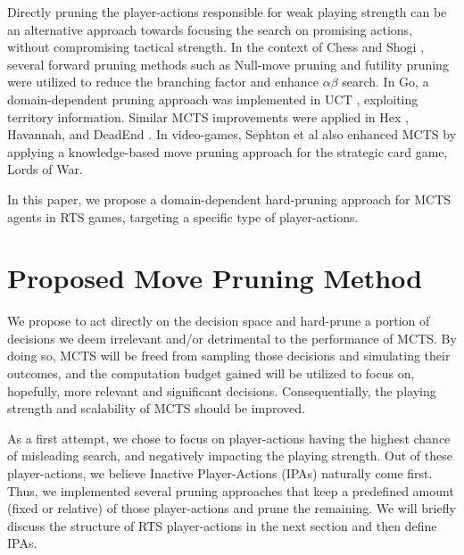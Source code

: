 \documentclass[conference]{IEEEtran}
\begin{document}
Directly pruning the player-actions responsible for weak playing strength can be an alternative approach towards focusing the search on promising actions, without compromising tactical strength. In the context of Chess \cite{heinz_adaptive_1999} and Shogi \cite{hoki_efficiency_2012}, several forward pruning methods such as Null-move pruning and futility pruning were utilized to reduce the branching factor and enhance $\alpha\beta$ search. In Go, a domain-dependent pruning approach was implemented in UCT \cite{huang_pruning_2010-1}, exploiting territory information. Similar MCTS improvements were applied in Hex \cite{arneson_monte_2010-1}, Havannah, \cite{dugueperoux_pruning_2016} and DeadEnd \cite{he_game_2008-1}. In video-games, Sephton et al \cite{sephton_heuristic_2014} also enhanced MCTS by applying a knowledge-based move pruning approach for the strategic card game, Lords of War.

In this paper, we propose a domain-dependent hard-pruning approach for MCTS agents in RTS games, targeting a specific type of player-actions.



\section{Proposed Move Pruning Method}
\label{sec:proposed_method}

We propose to act directly on the decision space and hard-prune a portion of decisions we deem irrelevant and/or detrimental to the performance of MCTS. By doing so, MCTS will be freed from sampling those decisions and simulating their outcomes, and the computation budget gained will be utilized to focus on, hopefully, more relevant and significant decisions. Consequentially, the playing strength and scalability of MCTS should be improved.

As a first attempt, we chose to focus on player-actions having the highest chance of misleading search, and negatively impacting the playing strength. Out of these player-actions, we believe Inactive Player-Actions (IPAs) naturally come first. Thus, we implemented several pruning approaches that keep a predefined amount (fixed or relative) of those player-actions and prune the remaining. We will briefly discuss the structure of RTS player-actions in the next section and then define IPAs.

\end{document}
